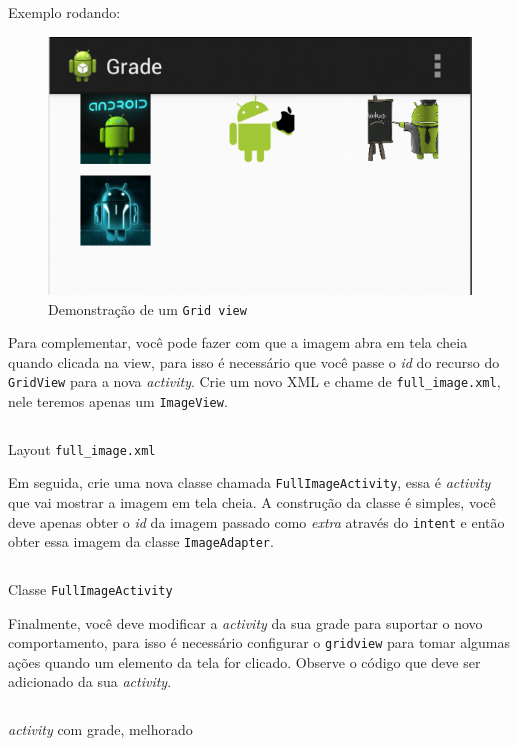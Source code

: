 \documentclass[a4paper,12pt,brazil,doubleside]{book}
\begin{document}
\begin{singlespace}
Exemplo rodando:

\begin{figure}[H]
  \centering
  \includegraphics[width=.475\textwidth]{figuras/design/grade-exemplo1.png}
  \caption{Demonstração de um \texttt{Grid view}}
  \label{fig:e}
\end{figure}

Para complementar, você pode fazer com que a imagem abra em tela cheia quando clicada na view, para isso é necessário que você passe o \emph{id} do recurso do \texttt{GridView} para a nova \emph{activity}.
Crie um novo XML e chame de \texttt{full\_image.xml}, nele teremos apenas um \texttt{ImageView}.

\begin{listing}[H]
\inputminted[linenos=true,fontsize=\small,frame=lines, framesep=2mm, tabsize=2,numbersep=5pt]{xml}{src/design/full-image.xml}
\caption{Layout \texttt{full\_image.xml}}
\end{listing}	

Em seguida, crie uma nova classe chamada \texttt{FullImageActivity}, essa é \emph{activity} que vai mostrar a imagem em tela cheia. A construção da classe é simples, você deve apenas obter o \emph{id} da imagem passado como \emph{extra} através do \texttt{intent} e então obter essa imagem da classe \texttt{ImageAdapter}.

\begin{listing}[H]
\inputminted[linenos=true,fontsize=\small,frame=lines, framesep=2mm, tabsize=2,numbersep=5pt]{java}{src/design/FullImageActivity.java}
\caption{Classe \texttt{FullImageActivity}}
\end{listing}	 	 	

Finalmente, você deve modificar a \emph{activity} da sua grade para suportar o novo comportamento, para isso é necessário configurar o \texttt{gridview} para tomar algumas ações quando um elemento da tela for clicado. Observe o código que deve ser adicionado da sua \emph{activity}.

\begin{listing}[H]
\inputminted[linenos=true,fontsize=\small,frame=lines, framesep=2mm, tabsize=2,numbersep=5pt]{java}{src/design/grid-activity-p2.java}
\caption{\emph{activity} com grade, melhorado}
\end{listing}	 


\end{singlespace}
\end{document}
